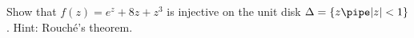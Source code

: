 Show that $f(z)=e^z+8z+z^3$ is injective on the unit disk
$\Delta=\{z\pipe|z|<1\}$. Hint: Rouch\'e's theorem.

